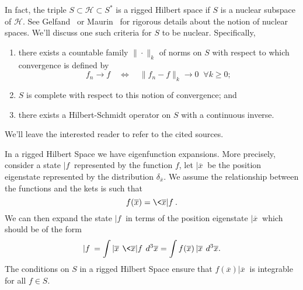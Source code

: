 \bigskip
\begin{ddanger}
In fact, the triple $S\subset\mathcal{H}\subset{S^{*}}$ is a
rigged Hilbert space if $S$ is a nuclear subspace of
$\mathcal{H}$. See Gelfand~\cite{gelfandgeneralized} or
Maurin~\cite{maurin} for rigorous details about the notion of
nuclear spaces. We'll discuss one such criteria for $S$ to be
nuclear. Specifically,
\begin{enumerate}
\item there exists a countable family $\|\cdot\|_{k}$ of norms on
$S$ with respect to which convergence is defined
by 
\begin{equation}
f_{n}\to{f}\quad\iff\quad\|f_{n}-f\|_{k}\to0\;\;\forall k\geq0;
\end{equation}
\item $S$ is complete with respect to this notion of
  convergence; and 
\item there exists a Hilbert-Schmidt operator on
  $S$ with a continuous inverse.
\end{enumerate}
We'll leave the interested reader to refer to the cited sources.
\end{ddanger}
\bigskip

In a rigged Hilbert Space we have eigenfunction expansions. More
precisely, consider a state $|f\>$ represented by the function
$f$, let $|\overline{x}\>$ be the position eigenstate represented
by the distribution $\delta_{\overline{x}}$. We assume the
relationship between the functions and the kets is such that
\begin{equation}%
f(\overline{x}) = \<\overline{x}|f\>.
\end{equation}
We can then expand the state $|f\>$ in terms of the position
eigenstate $|\overline{x}\>$ which should be of the form
\begin{equation}%
|f\> = \int |\overline{x}\>\,\<\overline{x}|f\>\,d^{3}\overline{x} = \int f(\overline{x})\,|\overline{x}\>\,d^{3}\overline{x}.
\end{equation}
The conditions on $S$ in a rigged Hilbert Space ensure that
$f(\overline{x})|\overline{x}\>$ is integrable for all $f\in{S}$.
